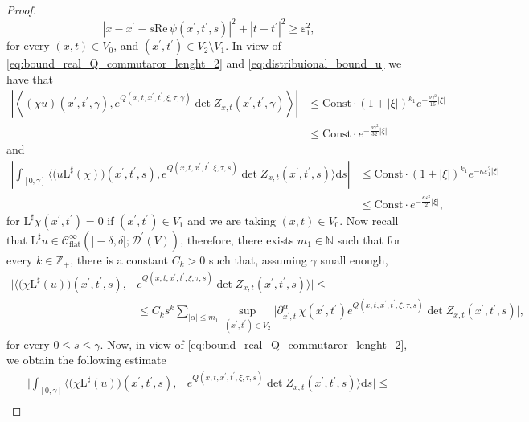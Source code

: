 \documentclass[11pt]{amsart}
\renewcommand{\epsilon}{\varepsilon}
\renewcommand{\Re}{\mathrm{Re}\,}
\theoremstyle{definition}
\theoremstyle{remark}
\theoremstyle{plain}
\begin{document}
\begin{proof}
%
\[
	|x-x^\prime - s \Re \psi(x^\prime, t^\prime, s)|^2 + |t-t^\prime|^2 \geq \epsilon_1^2,
\]
%
for every $(x,t) \in V_0$, and $(x^\prime, t^\prime) \in V_2\setminus V_1$. In view of \eqref{eq:bound_real_Q_commutaror_lenght_2} and \eqref{eq:distribuional_bound_u} we have that
%
\begin{align*}
	\left|\left\langle (\chi u)(x^\prime, t^\prime, \gamma), e^{Q(x,t,x^\prime, t^\prime, \xi,\tau, \gamma)} \det Z_{x,t}(x^\prime,t^\prime, \gamma) \right\rangle \right| & \leq \text{Const} \cdot (1+|\xi|)^{k_1} e^{-\frac{\rho\gamma^2}{16}|\xi|} \\
	& \leq \text{Const} \cdot e^{-\frac{\rho\gamma^2}{32}|\xi|}
\end{align*}
%
and
\begin{align*}
	\left|\int_{[0, \gamma]} \bigg\langle \big(u\mathrm{L}^\sharp(\chi)\big)(x^\prime, t^\prime, s),  e^{Q(x,t,x^\prime, t^\prime, \xi,\tau, s)}  \det Z_{x,t}(x^\prime,t^\prime, s) \bigg\rangle \mathrm{d} s \right| &  \leq \text{Const} \cdot  (1+|\xi|)^{k_1} e^{-\kappa \epsilon_1^2|\xi|} \\
	& \leq \text{Const} \cdot e^{-\frac{\kappa \epsilon_1^2}{2}|\xi|},
\end{align*}
%
for $\mathrm{L}^\sharp \chi(x^\prime, t^\prime) = 0$ if $(x^\prime, t^\prime) \in V_1$ and we are taking $(x,t) \in V_0$. Now recall that $\mathrm{L}^\sharp u \in \mathcal{C}^\infty_\text{flat}(]-\delta,\delta[;\mathcal{D}^\prime(V))$, therefore, there exists $m_1 \in \mathbb{N}$ such that for every $k \in \mathbb{Z}_+$, there is a constant $C_k > 0$ such that, assuming $\gamma$ small enough,
%
\begin{align}\label{eq:Lsharp_u}
	\bigg|\bigg\langle \big(\chi\mathrm{L}^\sharp(u)\big)(x^\prime, t^\prime, s), &  e^{Q(x,t,x^\prime, t^\prime, \xi,\tau, s)}  \det Z_{x,t}(x^\prime,t^\prime, s) \bigg\rangle \bigg| \leq \\ \nonumber
	& \leq C_k s^k \sum_{|\alpha|\leq m_1} \sup_{(x^\prime,t^\prime)\in V_2} \bigg| \partial_{x^\prime,t^\prime}^\alpha \chi(x^\prime,t^\prime)e^{Q(x,t,x^\prime, t^\prime, \xi,\tau, s)}  \det Z_{x,t}(x^\prime,t^\prime, s) \bigg|,
\end{align}
%
for every $ 0 \leq s \leq \gamma$. Now, in view of \eqref{eq:bound_real_Q_commutaror_lenght_2}, we obtain the following estimate
%
\begin{align*}
	\Bigg| \int_{[0, \gamma]} \bigg\langle \big(\chi\mathrm{L}^\sharp(u)\big)(x^\prime, t^\prime, s),  & e^{Q(x,t,x^\prime, t^\prime, \xi,\tau, s)}  \det Z_{x,t}(x^\prime,t^\prime, s) \bigg\rangle \mathrm{d} s \Bigg| \leq \\

\end{align*}
\end{proof}
\end{document}
